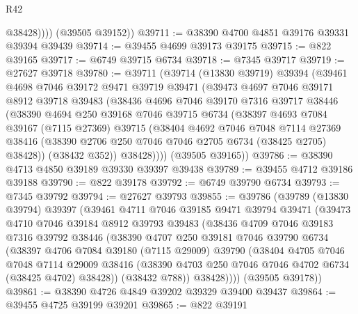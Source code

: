\begin{lexlean}{R42}
\begin{coremodule}
{              @38428))))
      (@39505 @39152))
@39711 := @38390 @4700 @4851 @39176 @39331 @39394 @39439
@39714 := @39455 @4699 @39173 @39175
@39715 := @822 @39165
@39717 := @6749 @39715 @6734
@39718 := @7345 @39717
@39719 := @27627 @39718
@39780 := @39711
    (@39714
      (@13830 @39719)
      @39394
      (@39461
        @4698
        @7046
        @39172
        @9471
        @39719
        @39471
        (@39473
          @4697
          @7046
          @39171
          @8912
          @39718
          @39483
          (@38436
            @4696
            @7046
            @39170
            @7316
            @39717
            @38446
            (@38390
              @4694
              @250
              @39168
              @7046
              @39715
              @6734
              (@38397
                @4693
                @7084
                @39167
                (@7115 @27369)
                @39715
                (@38404
                  @4692
                  @7046
                  @7048
                  @7114
                  @27369
                  @38416
                  (@38390 @2706 @250 @7046 @7046 @2705 @6734 (@38425 @2705) @38428))
                (@38432 @352))
              @38428))))
      (@39505 @39165))
@39786 := @38390 @4713 @4850 @39189 @39330 @39397 @39438
@39789 := @39455 @4712 @39186 @39188
@39790 := @822 @39178
@39792 := @6749 @39790 @6734
@39793 := @7345 @39792
@39794 := @27627 @39793
@39855 := @39786
    (@39789
      (@13830 @39794)
      @39397
      (@39461
        @4711
        @7046
        @39185
        @9471
        @39794
        @39471
        (@39473
          @4710
          @7046
          @39184
          @8912
          @39793
          @39483
          (@38436
            @4709
            @7046
            @39183
            @7316
            @39792
            @38446
            (@38390
              @4707
              @250
              @39181
              @7046
              @39790
              @6734
              (@38397
                @4706
                @7084
                @39180
                (@7115 @29009)
                @39790
                (@38404
                  @4705
                  @7046
                  @7048
                  @7114
                  @29009
                  @38416
                  (@38390 @4703 @250 @7046 @7046 @4702 @6734 (@38425 @4702) @38428))
                (@38432 @788))
              @38428))))
      (@39505 @39178))
@39861 := @38390 @4726 @4849 @39202 @39329 @39400 @39437
@39864 := @39455 @4725 @39199 @39201
@39865 := @822 @39191
}
\end{coremodule}
\end{lexlean}
